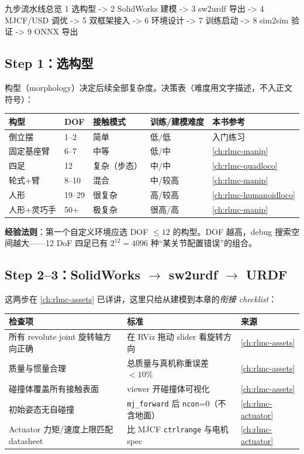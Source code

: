 \begin{codebox}[text]{九步流水线总览}
1 选构型 -> 2 SolidWorks 建模 -> 3 sw2urdf 导出 -> 4 MJCF/USD 调优
        -> 5 双框架接入 -> 6 环境设计 -> 7 训练启动 -> 8 sim2sim 验证 -> 9 ONNX 导出
\end{codebox}

\subsection{Step 1：选构型}
\label{sec:rlmc-diy-pipe-morph}

构型（morphology）决定后续全部复杂度。决策表（难度用文字描述，不入正文符号）：

\begin{center}
\small
\begin{tabular}{@{}lllll@{}}
\toprule
构型 & DOF & 接触模式 & 训练/建模难度 & 本书参考 \\
\midrule
倒立摆 & 1--2 & 简单 & 低/低 & 入门练习 \\
固定基座臂 & 6--7 & 中等 & 低/中 & \cref{ch:rlmc-manip} \\
四足 & 12 & 复杂（步态） & 中/中 & \cref{ch:rlmc-quadloco} \\
轮式+臂 & 8--10 & 混合 & 中/较高 & \cref{ch:rlmc-manip} \\
人形 & 19--29 & 很复杂 & 高/较高 & \cref{ch:rlmc-humanoidloco} \\
人形+灵巧手 & 50+ & 极复杂 & 很高/高 & \cref{ch:rlmc-manip} \\
\bottomrule
\end{tabular}
\end{center}

\textbf{经验法则}：第一个自定义环境应选 DOF $\le 12$ 的构型。DOF 越高，debug 搜索空间越大——12 DoF 四足已有 $2^{12}=4096$ 种“某关节配置错误”的组合。

\subsection{\texorpdfstring{Step 2--3：SolidWorks $\to$ sw2urdf $\to$ URDF}{Step 2-3：SolidWorks 到 sw2urdf 到 URDF}}
\label{sec:rlmc-diy-pipe-urdf}

这两步在 \cref{ch:rlmc-assets} 已详讲，这里只给从建模到本章的\emph{衔接 checklist}：

\begin{center}
\small
\begin{tabular}{@{}p{6.0cm}p{5.0cm}l@{}}
\toprule
检查项 & 标准 & 来源 \\
\midrule
所有 revolute joint 旋转轴方向正确 & 在 RViz 拖动 slider 看旋转方向 & \cref{ch:rlmc-assets} \\
质量与惯量合理 & 总质量与真机称重误差 $<10\%$ & \cref{ch:rlmc-assets} \\
碰撞体覆盖所有接触表面 & viewer 开碰撞体可视化 & \cref{ch:rlmc-assets} \\
初始姿态无自碰撞 & \verb|mj_forward| 后 \verb|ncon|=0（不含地面） & \cref{ch:rlmc-actuator} \\
Actuator 力矩/速度上限匹配 datasheet & 比 MJCF \verb|ctrlrange| 与电机 spec & \cref{ch:rlmc-actuator} \\
\bottomrule
\end{tabular}
\end{center}

